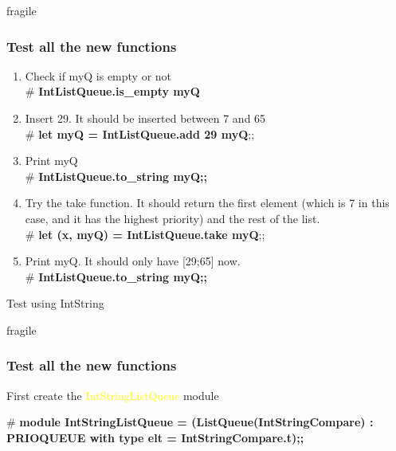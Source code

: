 \documentclass{beamer}
\begin{document}
\begin{frame}{fragile}
\frametitle{Test all the new functions}

\begin{example}
\begin{enumerate}
\item Check if myQ is empty or not \\
        \# {\bf IntListQueue.is\_empty myQ}
\item Insert 29. It should be inserted between 7 and 65\\
 \# {\bf let myQ = IntListQueue.add 29 myQ};;
 \item Print myQ\\
\# {\bf IntListQueue.to\_string myQ;;}
\item Try the take function. It should return the first element (which is 7 in this case, and it has the highest priority) and the rest of the list. \\
 \# {\bf let (x, myQ) = IntListQueue.take myQ};;
 \item Print myQ. It should only have [29;65] now.\\
\# {\bf IntListQueue.to\_string myQ;;}
\end{enumerate}
\end{example}
\end{frame}


\begin{frame}

\centerline{\huge Test using IntString}

\end{frame}








\begin{frame}{fragile}
\frametitle{Test all the new functions}

\begin{block}{First create the \textcolor{yellow}{IntStringListQueue} module}

\vspace*{0.1in}

\noindent
        \# {\bf module IntStringListQueue = (ListQueue(IntStringCompare) : \\
 \hspace*{0.5in}  PRIOQUEUE with type elt = IntStringCompare.t);;}

\end{block}

\end{frame}
\end{document}
